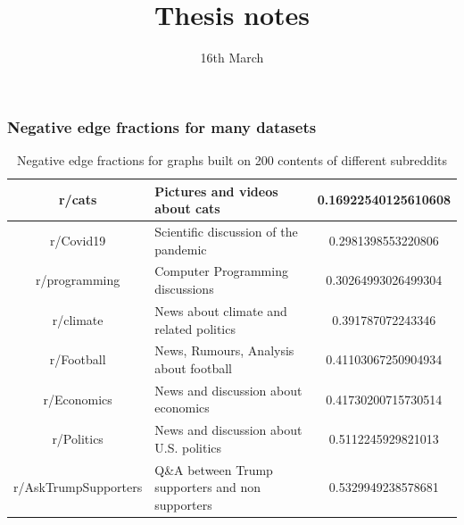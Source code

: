 \documentclass{beamer}
\title{Thesis notes}
\date{16th March}
\begin{document}
\frame{\titlepage}

\begin{frame}[c]
    \frametitle{Negative edge fractions for many datasets}

    \begin{table}[htpb]
        \centering

        \caption{Negative edge fractions for graphs built on 200 contents of
        different subreddits}
        {\footnotesize
            \begin{tabular}{c | p{6cm} | c}
                r/cats & Pictures and videos about cats & \num{0.16922540125610608} \\
                \hline
                r/Covid19 & Scientific discussion of the pandemic & \num{0.2981398553220806} \\
                \hline
                r/programming & Computer Programming discussions & \num{0.30264993026499304} \\
                \hline
                r/climate & News about climate and related politics & \num{0.391787072243346} \\
                \hline
                r/Football & News, Rumours, Analysis about football & \num{0.41103067250904934} \\
                \hline
                r/Economics & News and discussion about economics & \num{0.41730200715730514} \\
                \hline
                r/Politics & News and discussion about U.S. politics & \num{0.5112245929821013} \\
                \hline
                r/AskTrumpSupporters & {\tiny Q\&A between Trump supporters and non
                supporters} & \num{0.5329949238578681} \\
            \end{tabular}
        }

    \end{table}

\end{frame}
\end{document}
